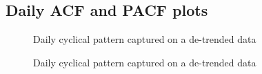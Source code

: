 \documentclass[
  letterpaper,
  DIV=11,
  numbers=noendperiod]{scrartcl}
\begin{document}
\pagebreak

\subsection{Daily ACF and PACF plots}\label{daily-acf-and-pacf-plots}

\begin{figure}


\caption{\label{fig-season-day-1}Daily cyclical pattern captured on a
de-trended data}

\end{figure}%

\begin{figure}


\caption{\label{fig-season-day-2}Daily cyclical pattern captured on a
de-trended data}

\end{figure}%
\end{document}
